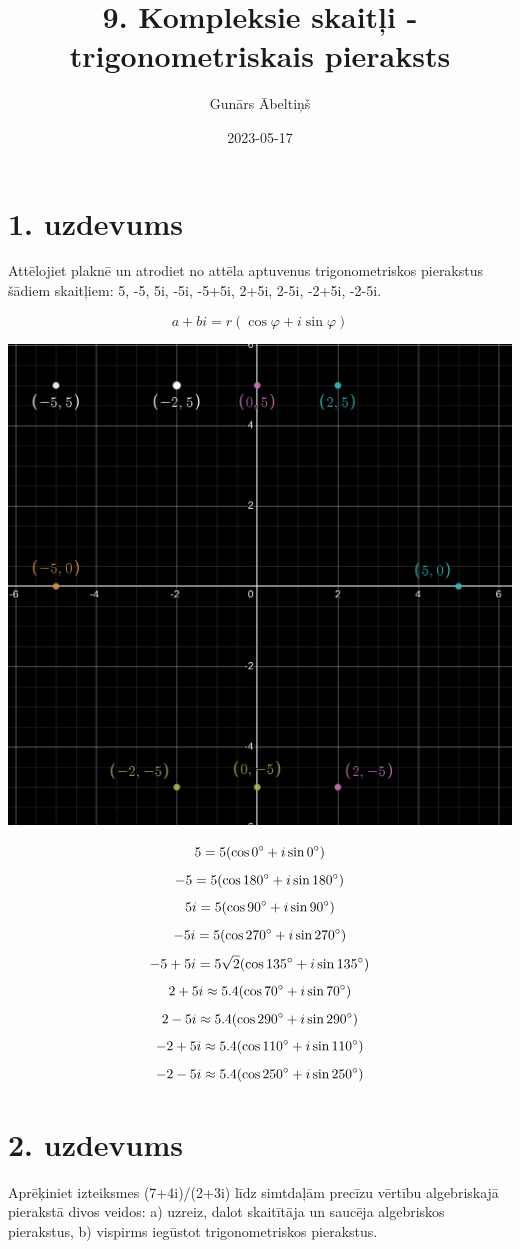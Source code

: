 \documentclass{article}
\title{9. Kompleksie skaitļi - trigonometriskais pieraksts}
\author{Gunārs Ābeltiņš}
\date{2023-05-17}
\begin{document}
\maketitle

\section*{1. uzdevums}
Attēlojiet plaknē un atrodiet no attēla aptuvenus trigonometriskos pierakstus šādiem skaitļiem: 5, -5, 5i, -5i, -5+5i, 2+5i, 2-5i, -2+5i, -2-5i.

$$ a+bi = r(\cos \varphi + i\sin \varphi)$$

\includegraphics[width=\textwidth]{1}

$$ 5 = 5(\cos 0\degree + i\sin 0\degree)$$
$$ -5 = 5(\cos 180\degree + i\sin 180\degree)$$
$$ 5i = 5(\cos 90\degree + i\sin 90\degree)$$
$$ -5i = 5(\cos 270\degree + i\sin 270\degree)$$
$$ -5+5i = 5\sqrt{2}(\cos 135\degree + i\sin 135\degree)$$
$$ 2+5i \approx 5.4(\cos 70\degree + i\sin 70\degree)$$
$$ 2-5i \approx 5.4(\cos 290\degree + i\sin 290\degree)$$
$$ -2+5i \approx 5.4(\cos 110\degree + i\sin 110\degree)$$
$$ -2-5i \approx 5.4(\cos 250\degree + i\sin 250\degree)$$

\section*{2. uzdevums}
Aprēķiniet izteiksmes (7+4i)/(2+3i) līdz simtdaļām precīzu vērtību algebriskajā pierakstā divos veidos: a) uzreiz, dalot skaitītāja un saucēja algebriskos pierakstus, b) vispirms iegūstot trigonometriskos pierakstus.
\end{document}
